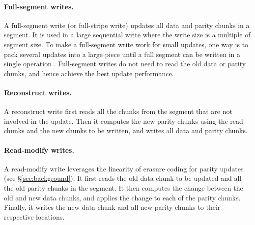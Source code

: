
\paragraph{Full-segment writes.} A full-segment write (or full-stripe write)
updates all data and parity chunks in a segment. 
It is used in a large sequential
write where the write size is a multiple of segment size.  To make a
full-segment write work for small updates, one way is to pack several updates
into a large piece until a full segment can be written in a single operation 
\cite{menon95}. Full-segment writes do not need to read the old data or parity
chunks, and hence achieve the best update performance.


\paragraph{Reconstruct writes.} A reconstruct write first reads all the chunks
from the segment that are not involved in the update.  Then it computes the new parity chunks
using the read chunks and the new chunks to be written, and writes all data
and parity chunks. 

\paragraph{Read-modify writes.} A read-modify write leverages the linearity of
erasure coding for parity updates (see \S\ref{sec:background}).  It first
reads the old data chunk to be updated and all the old parity chunks in the
segment.  It then computes the change between the old and new data chunks, and
applies the change to each of the parity chunks. 
Finally, it writes the new data chunk and all new parity chunks to their
respective locations. 

